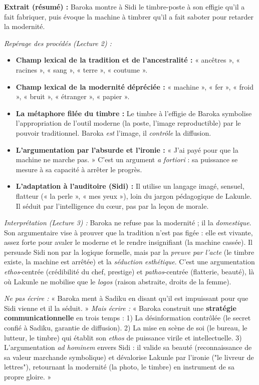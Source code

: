 \documentclass[11pt]{article}
\begin{document}
\begin{exemplebox}
\textbf{Extrait (résumé) :} Baroka montre à Sidi le timbre-poste à son effigie qu'il a fait fabriquer, puis évoque la machine à timbrer qu'il a fait saboter pour retarder la modernité.

\emph{Repérage des procédés (Lecture 2) :}
\begin{itemize}
    \item \textbf{Champ lexical de la tradition et de l'ancestralité :} « ancêtres », « racines », « sang », « terre », « coutume ».
    \item \textbf{Champ lexical de la modernité dépréciée :} « machine », « fer », « froid », « bruit », « étranger », « papier ».
    \item \textbf{La métaphore filée du timbre :} Le timbre à l'effigie de Baroka symbolise l'appropriation de l'outil moderne (la poste, l'image reproductible) par le pouvoir traditionnel. Baroka \emph{est} l'image, il \emph{contrôle} la diffusion.
    \item \textbf{L'argumentation par l'absurde et l'ironie :} « J'ai payé pour que la machine ne marche pas. » C'est un argument \emph{a fortiori} : sa puissance se mesure à sa capacité à arrêter le progrès.
    \item \textbf{L'adaptation à l'auditoire (Sidi) :} Il utilise un langage imagé, sensuel, flatteur (« la perle », « mes yeux »), loin du jargon pédagogique de Lakunle. Il séduit par l'intelligence du cœur, pas par la leçon de morale.
\end{itemize}

\emph{Interprétation (Lecture 3) :}
Baroka ne refuse pas la modernité ; il la \emph{domestique}. Son argumentaire vise à prouver que la tradition n'est pas figée : elle est vivante, assez forte pour avaler le moderne et le rendre insignifiant (la machine cassée). Il persuade Sidi non par la logique formelle, mais par la \emph{preuve par l'acte} (le timbre existe, la machine est arrêtée) et la \emph{séduction esthétique}. C'est une argumentation \emph{ethos}-centrée (crédibilité du chef, prestige) et \emph{pathos}-centrée (flatterie, beauté), là où Lakunle ne mobilise que le \emph{logos} (raison abstraite, droits de la femme).
\end{exemplebox}

\begin{attention}
\emph{Ne pas écrire :} « Baroka ment à Sadiku en disant qu'il est impuissant pour que Sidi vienne et il la séduit. »
\emph{Mais écrire :} « Baroka construit une \textbf{stratégie communicationnelle} en trois temps : 1) La désinformation contrôlée (le secret confié à Sadiku, garantie de diffusion). 2) La mise en scène de soi (le bureau, le lutteur, le timbre) qui établit son \emph{ethos} de puissance virile et intellectuelle. 3) L'argumentation \emph{ad hominem} envers Sidi : il valide sa beauté (reconnaissance de sa valeur marchande symbolique) et dévalorise Lakunle par l'ironie ("le livreur de lettres"), retournant la modernité (la photo, le timbre) en instrument de sa propre gloire. »
\end{attention}
\end{document}
